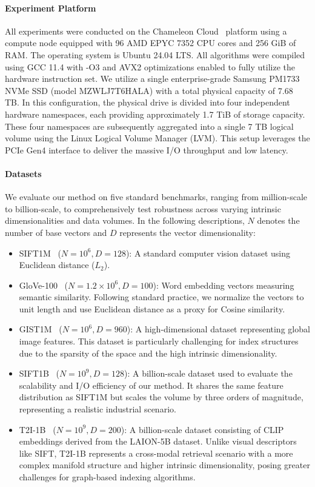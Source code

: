 \documentclass{article}
\theoremstyle{plain}
\theoremstyle{definition}
\theoremstyle{remark}
\begin{document}
\paragraph{Experiment Platform}
All experiments were conducted on the Chameleon Cloud~\cite{keahey2020lessons} platform using a compute node equipped with 96 AMD EPYC 7352 CPU cores and 256 GiB of RAM. 
The operating system is Ubuntu 24.04 LTS. All algorithms were compiled using GCC 11.4 with -O3 and AVX2 optimizations enabled to fully utilize the hardware instruction set.
We utilize a single enterprise-grade Samsung PM1733 NVMe SSD (model MZWLJ7T6HALA) with a total physical capacity of 7.68 TB. In this configuration, the physical drive is divided into four independent hardware namespaces, each providing approximately 1.7 TiB of storage capacity. These four namespaces are subsequently aggregated into a single 7 TB logical volume using the Linux Logical Volume Manager (LVM). 
This setup leverages the PCIe Gen4 interface to deliver the massive I/O throughput and low latency.

\paragraph{Datasets} 
We evaluate our method on five standard benchmarks, ranging from million-scale to billion-scale, to comprehensively test robustness across varying intrinsic dimensionalities and data volumes. In the following descriptions, $N$ denotes the number of base vectors and $D$ represents the vector dimensionality:
\begin{itemize}
    \item SIFT1M~\cite{jegou2011product} ($N=10^6, D=128$): A standard computer vision dataset using Euclidean distance ($L_2$).
    \item GloVe-100~\cite{pennington2014glove} ($N=1.2 \times 10^6, D=100$): Word embedding vectors measuring semantic similarity. Following standard practice, we normalize the vectors to unit length and use Euclidean distance as a proxy for Cosine similarity.
    \item GIST1M~\cite{jegou2011product} ($N=10^6, D=960$): A high-dimensional dataset representing global image features. This dataset is particularly challenging for index structures due to the sparsity of the space and the high intrinsic dimensionality.
    \item SIFT1B~\cite{jegou2011searching} ($N=10^9, D=128$): A billion-scale dataset used to evaluate the scalability and I/O efficiency of our method. It shares the same feature distribution as SIFT1M but scales the volume by three orders of magnitude, representing a realistic industrial scenario.
    \item T2I-1B~\cite{simhadri2025results} ($N=10^9, D=200$): A billion-scale dataset consisting of CLIP~\cite{radford2021learning} embeddings derived from the LAION-5B dataset. Unlike visual descriptors like SIFT, T2I-1B represents a cross-modal retrieval scenario with a more complex manifold structure and higher intrinsic dimensionality, posing greater challenges for graph-based indexing algorithms.
\end{itemize}
\end{document}
